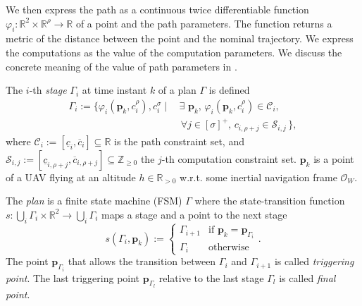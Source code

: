 We then express the path as a continuous twice differentiable function $\varphi_i:\mathbb{R}^2\times\mathbb{R}^\rho\rightarrow\mathbb{R}$ of a point and the path parameters. The function returns a metric of the distance between the point and the nominal trajectory. We express the computations as the value of the computation parameters. We discuss the concrete meaning of the value of path parameters in .

\begin{highlight}  
  \begin{defn}\label{def:mission}
    The $i$-th \emph{stage} $\Gamma_i$ at time instant $k$ of a plan $\Gamma$ is defined
    \begin{equation*}\begin{split}
      \Gamma_i:=\{\varphi_i(\mathbf{p}_k,c_i^\rho),c_i^\sigma\mid
      \,&\exists\,\,\mathbf{p}_k,\,\varphi_i(\mathbf{p}_k,c_i^\rho)\in\mathcal{C}_i,\,\\
        &\,\forall j\in[\sigma]^+,\,c_{i,\rho+j}\in\mathcal{S}_{i,j}\,\},
    \end{split}\end{equation*}
    where $\mathcal{C}_i:=[\underline{c}_i,\overline{c}_i]\subseteq\mathbb{R}$ is the path constraint set, and $\mathcal{S}_{i,j}:=[\underline{c}_{i,\rho+j},\overline{c}_{i,\rho+j}]\subseteq\mathbb{Z}_{\geq 0}$ the $j$-th computation constraint set. $\mathbf{p}_k$ is a point of a UAV flying at an altitude $h\in\mathbb{R}_{>0}$ w.r.t. some inertial navigation frame $\mathcal{O}_W$.
  
    The \emph{plan} is a finite state machine (FSM) $\Gamma$ where the state-transition function $s:\bigcup_i{\Gamma_i}\times\mathbb{R}^2\rightarrow\bigcup_i{\Gamma_i}$ maps a stage and a point to the next stage
    \begin{equation*}s(\Gamma_i,\mathbf{p}_k):=\begin{cases}
      \Gamma_{i+1} & \text{if }\mathbf{p}_k=\mathbf{p}_{\Gamma_i}\\
      \Gamma_i & \text{otherwise}
    \end{cases}.\end{equation*}
    The point $\mathbf{p}_{\Gamma_{i}}$ that allows the transition between $\Gamma_i$ and $\Gamma_{i+1}$ is called \emph{triggering point}. The last triggering point $\mathbf{p}_{\Gamma_{l}}$ relative to the last stage $\Gamma_l$ is called \emph{final point}.
  \end{defn}
\end{highlight}

